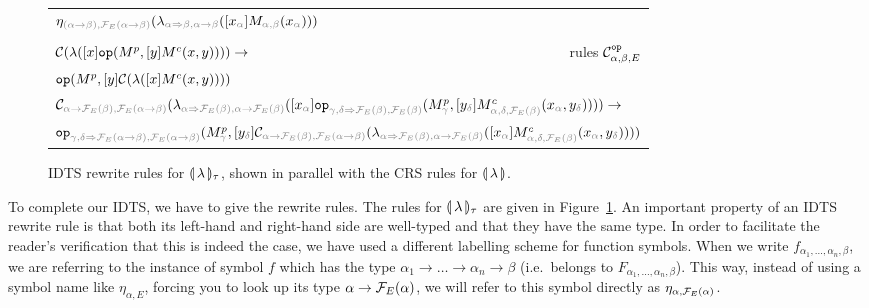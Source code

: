 \begin{sidewaysfigure}
\begin{tabular}{lr}
  \multicolumn{2}{l}{$\eta_{\typehint{(\alpha \to \beta), \FF_E(\alpha \to
    \beta)}} (\lambda_{\typehint{\alpha \To \beta, \alpha \to \beta}}([x_{\typehint\alpha}] M_{\typehint{\alpha, \beta}}(x_{\typehint\alpha})))$} \\
  \\
  $\mathcal{C} (\lambda([x] \mathtt{op} (M^p, [y]M^c(x, y)))) \to$ & rules $\mathcal{C}^{\mathtt{op}}_{\alpha, \beta, E}$ \\
  $\mathtt{op} (M^p, [y] \mathcal{C} (\lambda([x] M^c(x, y))))$ & \\
  \multicolumn{2}{l}{$\CC_{\typehint{\alpha \to \FF_E(\beta), \FF_E(\alpha \to \beta)}} (\lambda_{\typehint{\alpha \To \FF_E(\beta), \alpha \to \FF_E(\beta)}}([x_{\typehint\alpha}] \op{op}_{\typehint{\gamma, \delta \To \FF_E(\beta), \FF_E(\beta)}} (M^p_{\typehint\gamma}, [y_{\typehint\delta}]M^c_{\typehint{\alpha, \delta, \FF_E(\beta)}}(x_{\typehint\alpha}, y_{\typehint\delta})))) \to$} \\
  \multicolumn{2}{l}{$\op{op}_{\typehint{\gamma, \delta \To \FF_E(\alpha \to \beta), \FF_E(\alpha \to \beta)}} (M^p_{\typehint\gamma}, [y_{\typehint\delta}] \CC_{\typehint{\alpha \to \FF_E(\beta), \FF_E(\alpha \to \beta)}} (\lambda_{\typehint{\alpha \To \FF_E(\beta), \alpha \to \FF_E(\beta)}}([x_{\typehint\alpha}] M^c_{\typehint{\alpha, \delta, \FF_E(\beta)}}(x_{\typehint\alpha}, y_{\typehint\delta}))))$}
  \end{tabular}
  
  \caption{\label{fig:tau-types} IDTS rewrite rules for
    $\llparenthesis \, \lambda \, \rrparenthesis_\tau$, shown in parallel with the CRS rules for
    $\llparenthesis \, \lambda \, \rrparenthesis$.}
  
\end{sidewaysfigure}

To complete our IDTS, we have to give the rewrite rules. The rules for
$\llparenthesis \, \lambda \, \rrparenthesis_\tau$ are given in Figure~\ref{fig:tau-types}. An
important property of an IDTS rewrite rule is that both its left-hand and
right-hand side are well-typed and that they have the same type. In order
to facilitate the reader's verification that this is indeed the case, we
have used a different labelling scheme for function symbols. When we write
$f_{\alpha_1,\ldots,\alpha_n,\beta}$, we are referring to the instance of
symbol $f$ which has the type $\alpha_1 \to \ldots \to \alpha_n \to \beta$
(i.e.\ belongs to $F_{\alpha_1,\ldots,\alpha_n,\beta}$). This way, instead
of using a symbol name like $\eta_{\alpha,E}$, forcing you to look up its
type $\alpha \to \mathcal{F}_E(\alpha)$, we will refer to this symbol directly as
$\eta_{\alpha,\mathcal{F}_E(\alpha)}$.

